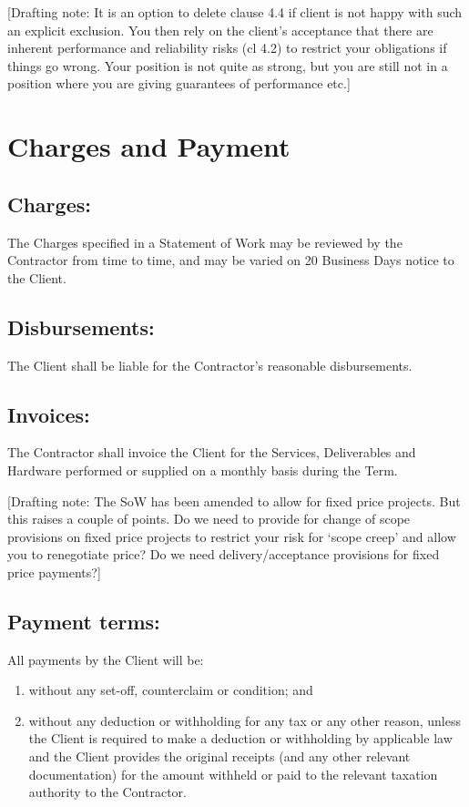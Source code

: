 \documentclass[a4paper,12pt]{article}
\begin{document}
[Drafting note:  It is an option to delete clause 4.4 if client is not happy with such an explicit exclusion.  You then rely on the client’s acceptance that there are inherent performance and reliability risks (cl 4.2) to restrict your obligations if things go wrong.  Your position is not quite as strong, but you are still not in a position where you are giving guarantees of performance etc.] 

\section{Charges and Payment}
\subsection{Charges:} The Charges specified in a Statement of Work may be reviewed by the Contractor from time to time, and may be varied on 20 Business Days notice to the Client.
\subsection{Disbursements:} The Client shall be liable for the Contractor’s reasonable disbursements.
\subsection{Invoices:}  The Contractor shall invoice the Client for the Services, Deliverables and Hardware performed or supplied on a monthly basis during the Term.   

[Drafting note:  The SoW has been amended to allow for fixed price projects.  But this raises a couple of points.  Do we need to provide for change of scope provisions on fixed price projects to restrict your risk for ‘scope creep’ and allow you to renegotiate price?  Do we need delivery/acceptance provisions for fixed price payments?]

\subsection{Payment terms:}  All payments by the Client will be:
\begin{enumerate}
\item without any set-off, counterclaim or condition; and
\item without any deduction or withholding for any tax or any other reason, unless the Client is required to make a deduction or withholding by applicable law and the Client provides the original receipts (and any other relevant documentation) for the amount withheld or paid to the relevant taxation authority to the Contractor.
\end{enumerate}
\end{document}
